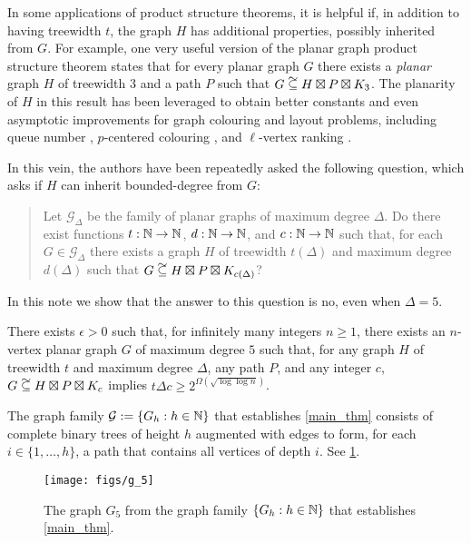 \documentclass{patmorin}
\renewcommand{\ge}{\geqslant}
\newcommand\subsetcong{\mathrel{\text{%
    \setbox0\hbox{$\subseteq$}%
    \rlap{\hbox to \wd0{\hss\hss\hss\raisebox{1.5\height}{$\sim$}\hss}}\box0
}}}
\begin{document}
In some applications of product structure theorems, it is helpful if, in addition to having treewidth $t$, the graph $H$ has additional properties, possibly inherited from $G$.  For example, one very useful version of the planar graph product structure theorem states that for every planar graph $G$ there exists a \emph{planar} graph $H$ of treewidth $3$ and a path $P$ such that $G\subsetcong H\boxtimes P\boxtimes K_3$.  The planarity of $H$ in this result has been leveraged to obtain better constants and even asymptotic improvements for graph colouring and layout problems, including queue number \cite{dujmovic.joret.ea:planar}, $p$-centered colouring \cite{debski.felsner.ea:improved}, and $\ell$-vertex ranking \cite{bose.dujmovic.ea:asymptotically}.

In this vein, the authors have been repeatedly asked the following question, which asks if $H$ can inherit bounded-degree from $G$:
\begin{quote}
  Let $\mathcal{G}_\Delta$ be the family of planar graphs of maximum degree $\Delta$.  Do there exist functions $t:\mathbb{N}\to\mathbb{N}$, $d:\mathbb{N}\to\mathbb{N}$, and $c:\mathbb{N}\to\mathbb{N}$ such that, for each $G\in\mathcal{G}_\Delta$ there exists a graph $H$ of treewidth $t(\Delta)$ and maximum degree $d(\Delta)$ such that $G\subsetcong H\boxtimes P\boxtimes K_{c(\Delta)}$?
\end{quote}
In this note we show that the answer to this question is no, even when $\Delta=5$.

\begin{thm}\label{main_thm}
  There exists $\epsilon > 0$ such that, for infinitely many integers $n\ge 1$, there exists an $n$-vertex planar graph $G$ of maximum degree $5$ such that, for any graph $H$ of treewidth $t$ and maximum degree $\Delta$, any path $P$, and any integer $c$, $G\subsetcong H\boxtimes P\boxtimes K_c$ implies $t\Delta c \ge 2^{\Omega(\sqrt{\log\log n})}$.
\end{thm}

The graph family $\mathcal{G}:=\{G_h:h\in\mathbb{N}\}$ that establishes \cref{main_thm} consists of complete binary trees of height $h$ augmented with edges to form, for each $i\in\{1,\ldots,h\}$, a path that contains all vertices of depth $i$.  See \cref{G_5}.

\begin{figure}
  \begin{center}
    \texttt{[image: figs/g\_5]}
  \end{center}
  \caption{The graph $G_5$ from the graph family $\{G_h:h\in\mathbb{N}\}$ that establishes \cref{main_thm}.}
  \label{G_5}
\end{figure}
\end{document}
